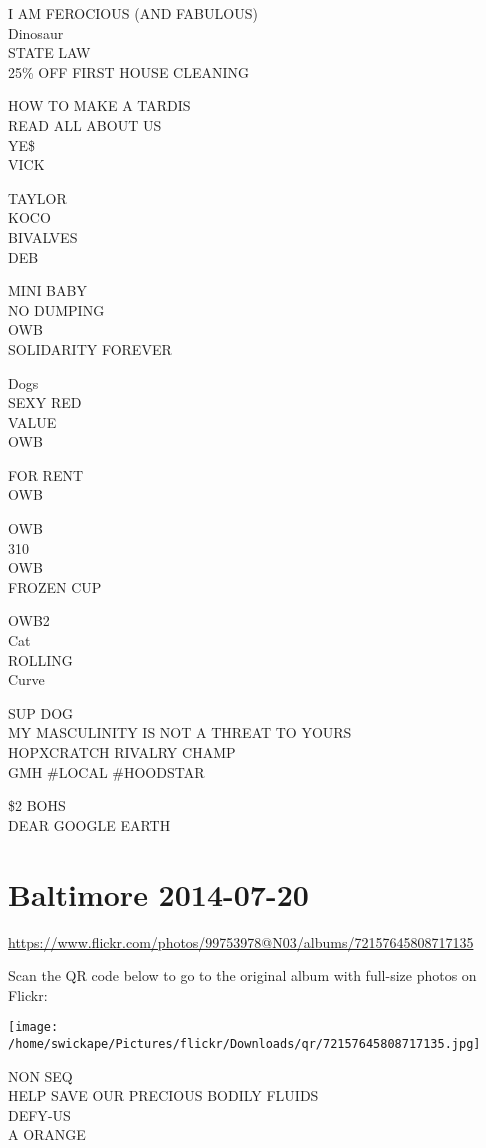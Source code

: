 \documentclass[10pt,letterpaper]{article}
\begin{document}
I AM FEROCIOUS (AND FABULOUS)\\
Dinosaur\\
STATE LAW\\
25\% OFF FIRST HOUSE CLEANING

HOW TO MAKE A TARDIS\\
READ ALL ABOUT US\\
YE\$\\
VICK

TAYLOR\\
KOCO\\
BIVALVES\\
DEB

MINI BABY\\
NO DUMPING\\
OWB\\
SOLIDARITY FOREVER

Dogs\\
SEXY RED\\
VALUE\\
OWB

FOR RENT\\
OWB

OWB\\
310\\
OWB\\
FROZEN CUP

OWB2\\
Cat\\
ROLLING\\
Curve

SUP DOG\\
MY MASCULINITY IS NOT A THREAT TO YOURS\\
HOPXCRATCH RIVALRY CHAMP\\
GMH \#LOCAL \#HOODSTAR

\$2 BOHS\\
DEAR GOOGLE EARTH
\pagebreak

\section*{Baltimore 2014-07-20}

\url{https://www.flickr.com/photos/99753978@N03/albums/72157645808717135}

Scan the QR code below to go to the original album with full-size photos on Flickr:

\texttt{[image: /home/swickape/Pictures/flickr/Downloads/qr/72157645808717135.jpg]}
\pagebreak

NON SEQ\\
HELP SAVE OUR PRECIOUS BODILY FLUIDS\\
DEFY{-}US\\
A ORANGE
\end{document}
